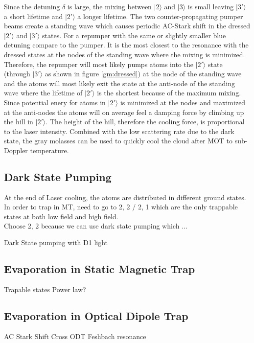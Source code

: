 Since the detuning $\delta$ is large, the mixing between $|2\rangle$ and $|3\rangle$ is small leaving $|3'\rangle$ a short lifetime and $|2'\rangle$ a longer lifetime. The two counter-propagating pumper beams create a standing wave which causes periodic AC-Stark shift in the dressed $|2'\rangle$ and $|3'\rangle$ states. For a repumper with the same or slightly smaller blue detuning compare to the pumper. It is the most closest to the resonance with the dressed states at the nodes of the standing wave where the mixing is minimized. Therefore, the repumper will most likely pumps atoms into the $|2'\rangle$ state (through $|3'\rangle$ as shown in figure \ref{gm:dressed}) at the node of the standing wave and the atoms will most likely exit the state at the anti-node of the standing wave where the lifetime of $|2'\rangle$ is the shortest because of the maximum mixing. Since potential enery for atoms in $|2'\rangle$ is minimized at the nodes and maximized at the anti-nodes the atoms will on average feel a damping force by climbing up the hill in $|2'\rangle$. The height of the hill, therefore the cooling force, is proportional to the laser intensity. Combined with the low scattering rate due to the dark state, the gray molasses can be used to quickly cool the cloud after MOT to sub-Doppler temperature.

\subsection{Dark State Pumping}\label{theory:pump}

At the end of Laser cooling, the atoms are distributed in different ground states.\\
In order to trap in MT, need to go to 2, 2 / 2, 1 which are the only trappable states at both low field and high field.\\
Choose 2, 2 because we can use dark state pumping which ...

Dark State pumping with D1 light

\subsection{Evaporation in Static Magnetic Trap}\label{theory:mt}
Trapable states
Power law?

\subsection{Evaporation in Optical Dipole Trap}\label{theory:odt}
AC Stark Shift
Cross ODT
Feshbach resonance
